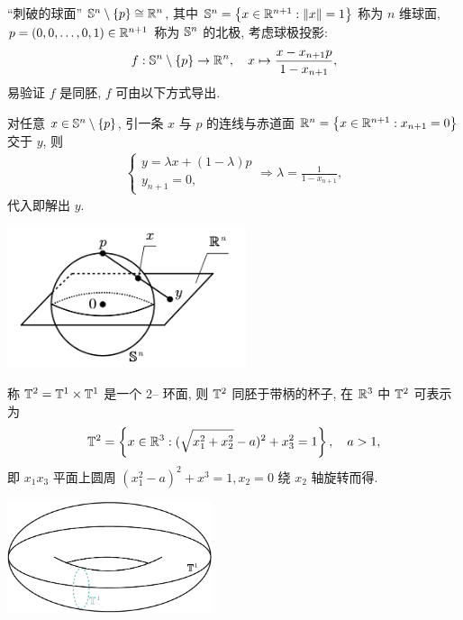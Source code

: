     \begin{Example}
        ``刺破的球面'' $ \S^{n}\sm\set{p}\cong\R^{n} $, 其中 $ \S^{n}=\set{x\in\R^{n+1}:\norm{x}=1} $ 称为 $ n $ 维球面, $ p=(0, 0, \dots, 0, 1)\in \R^{n+1} $ 称为 $ \S^{n} $ 的北极, 考虑球极投影:
        \begin{align*}
            f: \S^{n}\sm\set{p}\to \R^{n}, \quad x\mapsto \frac{x-x_{n+1}p}{1-x_{n+1}},
        \end{align*}
        易验证 $ f $ 是同胚, $ f $ 可由以下方式导出. 

        对任意 $ x\in\S^{n}\sm\set{p} $, 引一条 $ x $ 与 $ p $ 的连线与赤道面 $ \R^{n}=\set{x\in\R^{n+1}: x_{n+1}=0} $ 交于 $ y $, 则
        \begin{align*}
            \begin{cases}
                y=\lambda x+(1-\lambda)p \\
                y_{n+1}=0,
            \end{cases}
            \Longrightarrow \lambda=\frac{1}{1-x_{n+1}},
        \end{align*}
        代入即解出 $ y $.
        \begin{center}
            \includegraphics[width=7cm]{figures/TopoFig4.png}
        \end{center}
    \end{Example}
    
    \begin{Example}
        称 $ \T^{2}=\T^{1}\times\T^{1} $ 是一个 2-- 环面, 则 $ \T^{2} $ 同胚于带柄的杯子, 在 $ \R^{3} $ 中 $ \T^{2} $ 可表示为
        \begin{align*}
            \T^{2}=\set{x\in\R^{3}:(\sqrt{x_{1}^{2}+x_{2}^{2}}-a)^{2}+x_{3}^{2}=1},\quad a>1,
        \end{align*}
        即 $ x_{1}x_{3} $ 平面上圆周 $ (x_{1}^{2}-a)^{2}+x^{3}=1, x_{2}=0 $ 绕 $ x_{2} $ 轴旋转而得.
        \begin{center}
            \includegraphics[width=6cm]{figures/2-torus.png}
        \end{center}
    \end{Example}

